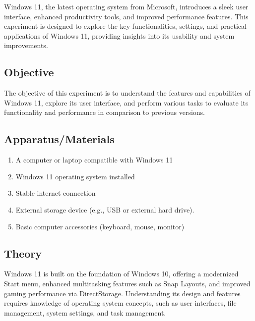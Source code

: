 \documentclass[a4paper,9pt]{article}
\begin{document}
	Windows 11, the latest operating system from Microsoft, introduces a sleek user interface, enhanced productivity tools, and improved performance features. This experiment is designed to explore the key functionalities, settings, and practical applications of Windows 11, providing insights into its usability and system improvements.
	
	\subsection{Objective}
	The objective of this experiment is to understand the features and capabilities of Windows 11, explore its user interface, and perform various tasks to evaluate its functionality and performance in comparison to previous versions.
	\subsection{Apparatus/Materials}
\begin{enumerate}
	\item A computer or laptop compatible with Windows 11
	\item Windows 11 operating system installed
	\item Stable internet connection
	\item External storage device (e.g., USB or external hard drive).
	\item Basic computer accessories (keyboard, mouse, monitor)
	
\end{enumerate}
	\subsection{Theory}
	Windows 11 is built on the foundation of Windows 10, offering a modernized Start menu, enhanced multitasking features such as Snap Layouts, and improved gaming performance via DirectStorage. Understanding its design and features requires knowledge of operating system concepts, such as user interfaces, file management, system settings, and task management.
	
\end{document}
